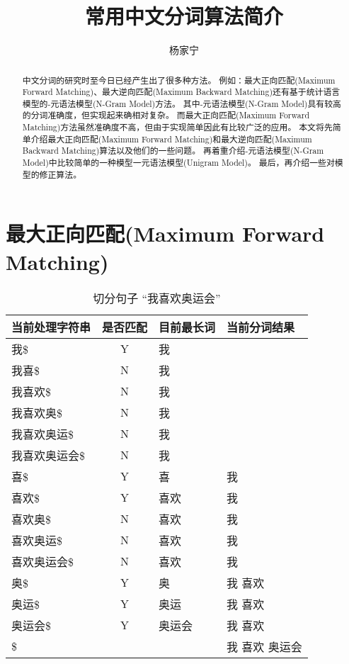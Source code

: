\documentclass[12pt,a4paper]{article}
\title{常用中文分词算法简介}
\author{杨家宁}
\def\chinese{
	\setmonofont{黑体}
	\setsansfont{微软雅黑}
	\setmainfont{宋体}
}
\def\maxforward{{\cn 最大正向匹配{\en(Maximum Forward Matching)}}}
\def\maxbackward{{\cn 最大逆向匹配{\en(Maximum Backward Matching)}}}
\def\NGram{{\cn {\en N}-元语法模型{\en(N-Gram Model)}}}
\def\UniGram{{\cn 一元语法模型{\en(Unigram Model)}}}
\begin{document}
\chinese
\maketitle

\def\abstractname{\bf 摘~~要}
\begin{abstract}
中文分词的研究时至今日已经产生出了很多种方法。
例如：\maxforward 、\maxbackward 还有基于统计语言模型的\NGram 方法。
其中\NGram 具有较高的分词准确度，但实现起来确相对复杂。
而\maxforward 方法虽然准确度不高，但由于实现简单因此有比较广泛的应用。
本文将先简单介绍\maxforward 和\maxbackward 算法以及他们的一些问题。
再着重介绍\NGram 中比较简单的一种模型\UniGram 。
最后，再介绍一些对模型的修正算法。
\end{abstract}

\section{\maxforward}
\begin{table}
\caption{切分句子 “我喜欢奥运会”}
\label{tbl_maxforward}
	\begin{center}
		\begin{tabular}{l|c|l|l}
			当前处理字符串 & 是否匹配    & 目前最长词 & 当前分词结果   \\
			\hline
			我\$           & {\en Y}  & 我         &                \\
			我喜\$         & {\en N}  & 我         &                \\
			我喜欢\$       & {\en N}  & 我         &                \\
			我喜欢奥\$     & {\en N}  & 我         &                \\
			我喜欢奥运\$   & {\en N}  & 我         &                \\
			我喜欢奥运会\$ & {\en N}  & 我         &                \\
			喜\$           & {\en Y}  & 喜         & 我             \\ 
			喜欢\$         & {\en Y}  & 喜欢       & 我             \\ 
			喜欢奥\$       & {\en N}  & 喜欢       & 我             \\ 
			喜欢奥运\$     & {\en N}  & 喜欢       & 我             \\ 
			喜欢奥运会\$   & {\en N}  & 喜欢       & 我             \\ 
			奥\$           & {\en Y}  & 奥         & 我 喜欢        \\ 
			奥运\$         & {\en Y}  & 奥运       & 我 喜欢        \\ 
			奥运会\$       & {\en Y}  & 奥运会     & 我 喜欢        \\ 
		    \$             &          &            & 我 喜欢 奥运会 \\
		\end{tabular}
	\end{center}
\end{table}
\end{document}
